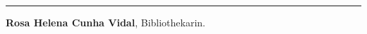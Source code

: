 \begin{center}\rule{0.5\linewidth}{\linethickness}\end{center}

\textbf{Rosa Helena Cunha Vidal}, Bibliothekarin.
